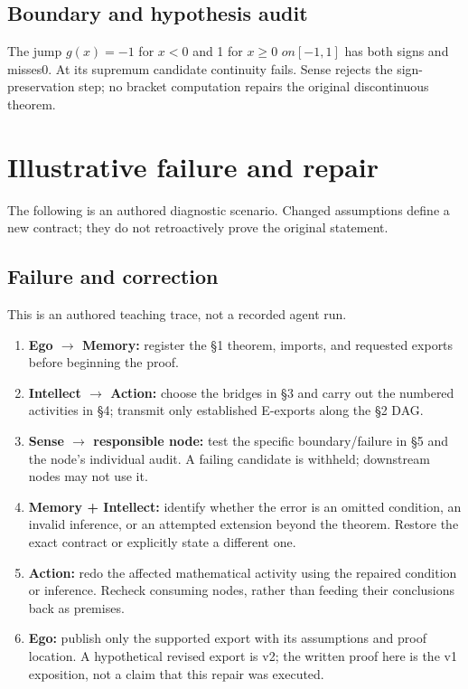 \documentclass[preprint,12pt,aps,pra,showkeys,amsmath,amssymb,superscriptaddress,floatfix]{revtex4-2}
\theoremstyle{definition}
\theoremstyle{remark}
\providecommand{\tightlist}{\setlength{\itemsep}{2pt}\setlength{\parskip}{0pt}}
\begin{document}
\subsection{Boundary and hypothesis audit}

The jump \(g(x)=-1\) for \(x<0\) and 1 for \(x\ge 0\) \(on[-1,1]\) has
both signs and misses0. At its supremum candidate continuity fails.
Sense rejects the sign-preservation step; no bracket computation repairs
the original discontinuous theorem.

\section{Illustrative failure and repair}

The following is an authored diagnostic scenario. Changed assumptions
define a new contract; they do not retroactively prove the original
statement.

\subsection{Failure and correction}
This is an authored teaching trace, not a recorded agent run.

\begin{enumerate}
\def\labelenumi{\arabic{enumi}.}
\tightlist
\item
  \textbf{Ego \(\to\) Memory:} register the §1 theorem, imports, and
  requested exports before beginning the proof.
\item
  \textbf{Intellect \(\to\) Action:} choose the bridges in §3 and carry
  out the numbered activities in §4; transmit only established E-exports
  along the §2 DAG.
\item
  \textbf{Sense \(\to\) responsible node:} test the specific
  boundary/failure in §5 and the node's individual audit. A failing
  candidate is withheld; downstream nodes may not use it.
\item
  \textbf{Memory + Intellect:} identify whether the error is an omitted
  condition, an invalid inference, or an attempted extension beyond the
  theorem. Restore the exact contract or explicitly state a different
  one.
\item
  \textbf{Action:} redo the affected mathematical activity using the
  repaired condition or inference. Recheck consuming nodes, rather than
  feeding their conclusions back as premises.
\item
  \textbf{Ego:} publish only the supported export with its assumptions
  and proof location. A hypothetical revised export is v2; the written
  proof here is the v1 exposition, not a claim that this repair was
  executed.
\end{enumerate}
\end{document}
